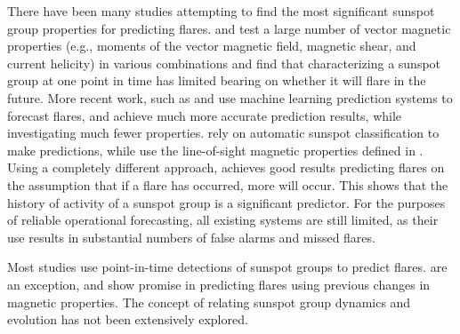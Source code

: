 There have been many studies attempting to find the most significant sunspot group properties for predicting flares. \cite{Leka:2003a,Leka:2003b,Leka:2007} and \cite{Barnes:2006} test a large number of vector magnetic properties (e.g., moments of the vector magnetic field, magnetic shear, and current helicity) in various combinations and find that characterizing a sunspot group at one point in time has limited bearing on whether it will flare in the future. More recent work, such as \cite{Colak:2009} and \cite{Ahmed:2011} use machine learning prediction systems to forecast flares, and achieve much more accurate prediction results, while investigating much fewer properties.\cite{Colak:2009} rely on automatic sunspot classification to make predictions, while \cite{Ahmed:2011} use the line-of-sight magnetic properties defined in \cite{higgins:2011}.  Using a completely different approach, \cite{Wheatland:2005} achieves good results predicting flares on the assumption that if a flare has occurred, more will occur. This shows that the history of activity of a sunspot group is a significant predictor. For the purposes of reliable operational forecasting, all existing systems are still limited, as their use results in substantial numbers of false alarms and missed flares. 

Most studies use point-in-time detections of sunspot groups to predict flares. \cite{Mason:2010} are an exception, and show promise in predicting flares using previous changes in magnetic properties. %
The concept of relating sunspot group dynamics and evolution has not been extensively explored.


